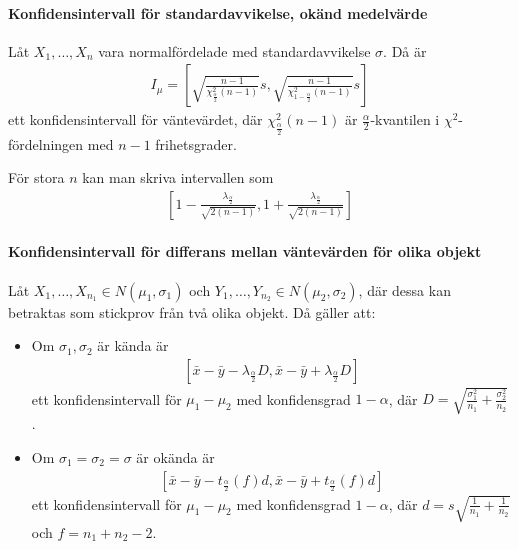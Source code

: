 \paragraph{Konfidensintervall för standardavvikelse, okänd medelvärde}
Låt $X_1, \dots, X_{n}$ vara normalfördelade med standardavvikelse $\sigma$. Då är
\begin{align*}
	I_{\mu} = \left[\sqrt{\frac{n - 1}{\chi_{\frac{\alpha}{2}}^2(n - 1)}}s, \sqrt{\frac{n - 1}{\chi_{1 - \frac{\alpha}{2}}^2(n - 1)}}s\right]
\end{align*}
ett konfidensintervall för väntevärdet, där $\chi_{\frac{\alpha}{2}}^2(n - 1)$ är $\frac{\alpha}{2}$-kvantilen i $\chi^2$-fördelningen med $n - 1$ frihetsgrader.

För stora $n$ kan man skriva intervallen som
\begin{align*}
	\left[1 - \frac{\lambda_{\frac{\alpha}{2}}}{\sqrt{2(n - 1)}}, 1 + \frac{\lambda_{\frac{\alpha}{2}}}{\sqrt{2(n - 1)}}\right]
\end{align*}

\proof

\paragraph{Konfidensintervall för differans mellan väntevärden för olika objekt}
Låt $X_1, \dots, X_{n_1}\in N(\mu_1, \sigma_1)$ och $Y_1, \dots, Y_{n_2}\in N(\mu_2, \sigma_2)$, där dessa kan betraktas som stickprov från två olika objekt. Då gäller att:
\begin{itemize}
	\item Om $\sigma_1, \sigma_2$ är kända är
	\begin{align*}
		\left[\bar{x} - \bar{y} - \lambda_{\frac{\alpha}{2}}D, \bar{x} - \bar{y} + \lambda_{\frac{\alpha}{2}}D\right]
	\end{align*}
	ett konfidensintervall för $\mu_1 - \mu_2$ med konfidensgrad $1 - \alpha$, där $D = \sqrt{\frac{\sigma_1^2}{n_1} + \frac{\sigma_2^2}{n_2}}$.
	
	\item Om $\sigma_1 = \sigma_2 = \sigma$ är okända är
	\begin{align*}
		\left[\bar{x} - \bar{y} - t_{\frac{\alpha}{2}}(f)d, \bar{x} - \bar{y} + t_{\frac{\alpha}{2}}(f)d\right]
	\end{align*}
	ett konfidensintervall för $\mu_1 - \mu_2$ med konfidensgrad $1 - \alpha$, där $d = s\sqrt{\frac{1}{n_1} + \frac{1}{n_2}}$ och $f = n_1 + n_2 - 2$.
\end{itemize}

